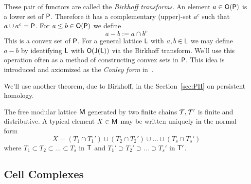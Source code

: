 These pair of functors are called the {\em Birkhoff transforms}.   An element $a\in {\mathsf O}({\mathsf P})$ is a lower set of ${\mathsf P}$.  Therefore it has a complementary (upper)-set $a^c$ such that $a\cup a^c = {\mathsf P}$.    For $a\leq b\in {\mathsf O}({\mathsf P})$ we define $$a-b:=a\cap b^c$$   This is a convex set of ${\mathsf P}$.  For a general lattice ${\mathsf L}$ with $a,b\in {\mathsf L}$ we may define $a-b$ by identifying ${\mathsf L}$ with ${\mathsf O}({\mathsf J}({\mathsf L}))$ via the Birkhoff transform.  We'll use this operation often as a method of constructing convex sets in ${\mathsf P}$.  This idea is introduced and axiomized as the {\em Conley form} in~\cite{kmv3}.  

We'll use another theorem, due to Birkhoff, in the Section~\ref{sec:PH} on persistent homology.

\begin{thm}\label{thm:birkhoff:chains}
The free modular lattice ${\mathsf M}$ generated by two finite chains ${\mathcal T},{\mathcal T}'$ is finite and distributive.  A typical element $X\in {\mathsf M}$ may be written uniquely in the normal form
\[
X = (T_1\cap T_1') \cup (T_2\cap T_2') \cup\ldots \cup (T_s\cap T_s')
\]
where $T_1\subset T_2\subset \ldots \subset T_s$ in ${\mathsf T}$ and $T_1'\supset T_2'\supset \ldots \supset T_s'$ in ${\mathsf T}'$.
\end{thm}



%
%
%
%


\subsection{Cell Complexes}\label{sec:prelims:cell}

